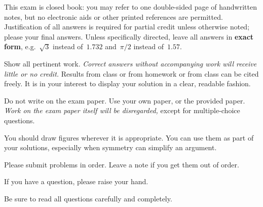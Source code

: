 This exam is closed book: you may refer to one double-sided page of handwritten notes, but no electronic aids or other
printed references are permitted. Justification of all answers is required
for partial credit unless otherwise noted; please  your final answers. Unless specifically directed, leave all answers in \textbf{exact form}, e.g.\ $\sqrt{3}$ instead of~$1.732$ and~$\pi/2$ instead of~$1.57$.

Show all pertinent work. \emph{Correct answers without accompanying work will receive little or no credit.} Results from class or from homework or from class can be cited freely. It is in your interest to display your solution in a
clear, readable fashion.

Do not write on the exam paper. Use your own paper, or the provided paper. \emph{Work on the exam paper itself will be disregarded,} except for multiple-choice questions.

You should draw figures wherever it is appropriate. You can use them as part of your solutions, especially when symmetry can simplify an argument.

Please submit problems in order. Leave a note if you get them out of order.

If you have a question, please raise your hand.

Be sure to read all questions carefully and completely.
